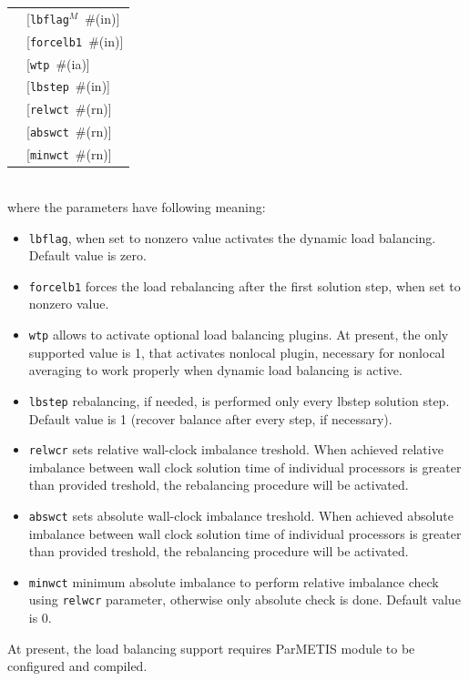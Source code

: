 \documentclass[a4paper]{article}
\makeatletter
\newcommand{\param}[1]{\texttt{#1}} %
\newcommand{\optional}[1]{[#1]} %
\newcommand{\field}[2]{\param{#1}~\#{\tiny(#2)}} %
\newcommand{\optField}[2]{\optional{\field{#1}{#2}}}
\newenvironment{record}[1][]{\begin{tabular}{|ll}}{\end{tabular}\\}
\newcommand{\recentry}[2]{{#1}&{#2}\\}
\newcounter{rcc}
\newenvironment{record}[1][\textwidth]{\setcounter{rcc}{0}\begin{tabular*}{#1}{|ll@{\extracolsep{\fill}}r}}{\end{tabular*}\\}
\newcommand{\recentry}[2]{\ifthenelse{\value{rcc}>0}{&$\backslash$ \\}{\setcounter{rcc}{1}}{#1}&{#2}}
\makeatother
\begin{document}
\noindent
\begin{record}
  \recentry{\hspace{20mm}}{\optField{lbflag$^M$}{in}}
  \recentry{}{\optField{forcelb1}{in}}
  \recentry{}{\optField{wtp}{ia}}
  \recentry{}{\optField{lbstep}{in}}
  \recentry{}{\optField{relwct}{rn}}
  \recentry{}{\optField{abswct}{rn}}
  \recentry{}{\optField{minwct}{rn}}
\end{record}
where the parameters have following meaning:
\begin{itemize}
\item \param{lbflag}, when set to nonzero value activates the dynamic load balancing. Default value is zero.
\item \param{forcelb1} forces the load rebalancing after the first solution step, when set to nonzero value.
\item \param{wtp} allows to activate optional load balancing plugins. At present, the only supported value is 1, that activates nonlocal plugin, necessary for nonlocal averaging to work properly when dynamic load balancing is active.
\item \param{lbstep} rebalancing, if needed, is performed only every lbstep solution step.
Default value is 1 (recover balance after every step, if necessary).
\item \param{relwcr} sets relative wall-clock imbalance treshold. When achieved relative imbalance between wall clock solution time of individual processors is greater than provided treshold, the rebalancing procedure will be activated.
\item \param{abswct} sets absolute wall-clock imbalance treshold. When achieved absolute imbalance between wall clock solution time of individual processors is greater than provided treshold, the rebalancing procedure will be activated.
\item \param{minwct} minimum absolute imbalance to perform relative imbalance check using \param{relwcr} parameter,  otherwise only absolute check is done. Default value is 0.
\end{itemize}
At present, the load balancing support requires ParMETIS module to be configured and compiled.


%
\end{document}
